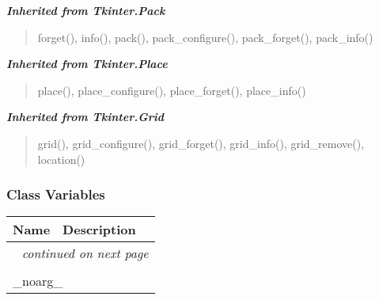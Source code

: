 \large{\textbf{\textit{Inherited from Tkinter.Pack}}}

\begin{quote}
forget(), info(), pack(), pack\_configure(), pack\_forget(), pack\_info()
\end{quote}

\large{\textbf{\textit{Inherited from Tkinter.Place}}}

\begin{quote}
place(), place\_configure(), place\_forget(), place\_info()
\end{quote}

\large{\textbf{\textit{Inherited from Tkinter.Grid}}}

\begin{quote}
grid(), grid\_configure(), grid\_forget(), grid\_info(), grid\_remove(), location()
\end{quote}


  \subsubsection{Class Variables}

    \vspace{-1cm}
\hspace{\varindent}\begin{longtable}{|p{\varnamewidth}|p{\vardescrwidth}|l}
\cline{1-2}
\cline{1-2} \centering \textbf{Name} & \centering \textbf{Description}& \\
\cline{1-2}
\endhead\cline{1-2}\multicolumn{3}{r}{\small\textit{continued on next page}}\\\endfoot\cline{1-2}
\endlastfoot\multicolumn{2}{|l|}{\textit{Inherited from Tkinter.Misc}}\\
\multicolumn{2}{|p{\varwidth}|}{\raggedright \_noarg\_}\\
\cline{1-2}
\end{longtable}




